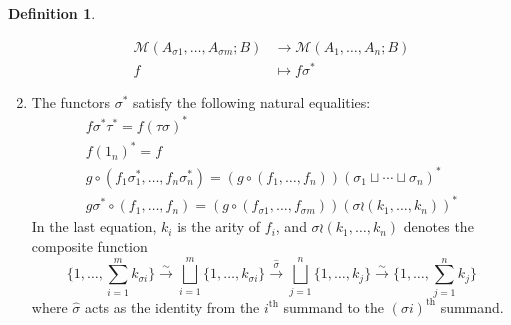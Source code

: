 \documentclass{amsart}
\theoremstyle{definition}
\newtheorem{defn}[thm]{Definition}
\def\M{\mathcal{M}}
\def\toiso{\xrightarrow{\sim}}
\begin{document}
\begin{defn}
\begin{enumerate}
    \begin{align*}
      \M(A_{\sigma 1},\dots,A_{\sigma m}; B) &\to \M(A_1,\dots,A_n;B)\\
      f &\mapsto f\sigma^*
    \end{align*}
  \item The functors $\sigma^*$ satisfy the following natural equalities:
    \begin{gather*}
      f \sigma^* \tau^* = f(\tau\sigma)^*\\
      f (1_n)^* = f\\
      g\circ (f_1 \sigma_1^* ,\dots, f_n \sigma_n^*) = (g \circ (f_1,\dots,f_n))(\sigma_1\sqcup \cdots \sqcup \sigma_n)^*\\
      g\sigma^* \circ (f_1,\dots,f_n) = (g\circ (f_{\sigma 1},\dots, f_{\sigma m}))(\sigma \wr (k_1,\dots,k_n))^*
    \end{gather*}
    In the last equation, $k_i$ is the arity of $f_i$, and $\sigma \wr (k_1,\dots,k_n)$ denotes the composite function
    \begin{equation*}
      \{1,\dots,\textstyle\sum_{i=1}^m k_{\sigma i} \}
      \toiso \bigsqcup_{i=1}^m \{1,\dots,k_{\sigma i}\}
      \xrightarrow{\widehat{\sigma}} \bigsqcup_{j=1}^n \{1,\dots,k_{j}\}
      \toiso \{1,\dots,\textstyle\sum_{j=1}^n k_j \}
    \end{equation*}
    where $\widehat{\sigma}$ acts as the identity from the $i^{\mathrm{th}}$ summand to the $(\sigma i)^{\mathrm{th}}$ summand.
  \end{enumerate}
\end{defn}
\end{document}
